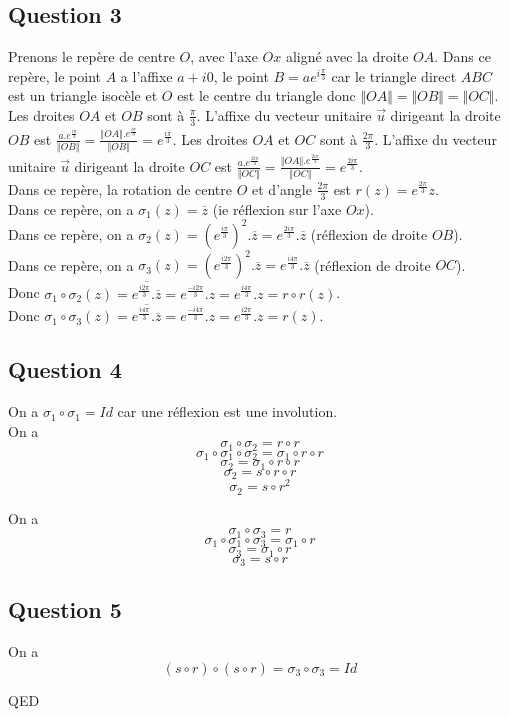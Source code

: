 \documentclass[]{book}
\theoremstyle{definition}
\begin{document}
\subsection*{Question 3}
Prenons le rep\`ere de centre $O$, avec l'axe $Ox$ align\'e avec la droite $OA$. Dans ce rep\`ere, le point $A$ a l'affixe $a+i0$, le point $B = ae^{i\frac{\pi}{3}}$ car le triangle direct $ABC$ est un triangle isoc\`ele et $O$ est le centre du triangle donc $\Vert OA \Vert = \Vert OB \Vert = \Vert OC \Vert$. Les droites $OA$ et $OB$ sont \`a $\frac{\pi}{3}$. L'affixe du vecteur unitaire $\overrightarrow{u}$ dirigeant la droite $OB$ est $\frac{a.e^{\frac{i\pi}{3}}}{\Vert OB \Vert} = \frac{\Vert OA \Vert.e^{\frac{i\pi}{3}}}{\Vert OB \Vert} = e^{\frac{i\pi}{3}}$. Les droites $OA$ et $OC$ sont \`a $\frac{2\pi}{3}$. L'affixe du vecteur unitaire $\overrightarrow{u}$ dirigeant la droite $OC$ est $\frac{a.e^{\frac{2i\pi}{3}}}{\Vert OC \Vert} = \frac{\Vert OA \Vert.e^{\frac{2i\pi}{3}}}{\Vert OC \Vert} = e^{\frac{2i\pi}{3}}$.\\

Dans ce rep\`ere, la rotation de centre $O$ et d'angle $\frac{2\pi}{3}$ est $r(z) = e^{\frac{2\pi}{3}}z$.\\

Dans ce rep\`ere, on a $\sigma_1(z) = \overline{z}$ (ie r\'eflexion sur l'axe $Ox$).\\

Dans ce rep\`ere, on a  $\sigma_2(z) = (e^{\frac{i\pi}{3}})^2.\overline{z} = e^{\frac{2i\pi}{3}}.\overline{z}$ (r\'eflexion de droite $OB$). \\

Dans ce rep\`ere, on a  $\sigma_3(z) = (e^{\frac{i2\pi}{3}})^2.\overline{z} = e^{\frac{i4\pi}{3}}.\overline{z} $ (r\'eflexion de droite $OC$). \\

Donc $\sigma_1 \circ \sigma_2(z) = \overline{e^{\frac{i2\pi}{3}}.\overline{z}} = e^{\frac{-i2\pi}{3}}.z = e^{\frac{i4\pi}{3}}.z = r \circ r(z)$.\\

Donc $\sigma_1 \circ \sigma_3(z) = \overline{e^{\frac{i4\pi}{3}}.\overline{z}} = e^{\frac{-i4\pi}{3}}.z = e^{\frac{i2\pi}{3}}.z = r(z)$.\\


\subsection*{Question 4}
On a $\sigma_1 \circ \sigma_1 = Id$ car une r\'eflexion est une involution.\\
On a
$$\sigma_1 \circ \sigma_2 = r \circ r$$
$$\sigma_1 \circ \sigma_1 \circ \sigma_2 = \sigma_1 \circ r \circ r$$
$$\sigma_2 = \sigma_1 \circ r \circ r$$
$$\sigma_2 = s \circ r \circ r$$
$$\sigma_2 = s \circ r^2$$

On a
$$\sigma_1 \circ \sigma_3 = r$$
$$\sigma_1 \circ \sigma_1 \circ \sigma_3 = \sigma_1 \circ r$$
$$\sigma_3 = \sigma_1 \circ r$$
$$\sigma_3 = s \circ r$$


\subsection*{Question 5}
On a
$$ (s \circ r) \circ (s \circ r) = \sigma_3 \circ \sigma_3 = Id$$
 

QED
\end{document}
